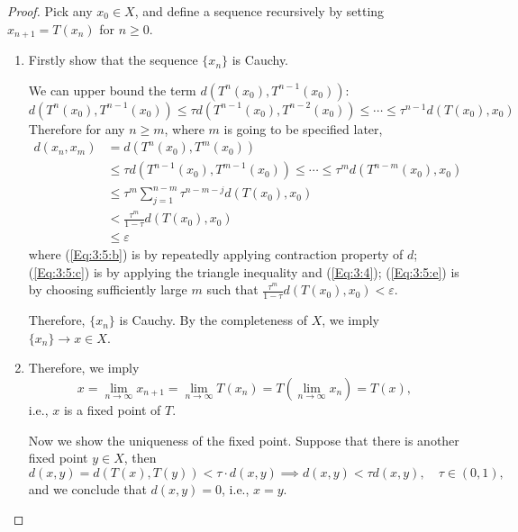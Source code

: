 \begin{proof}
Pick any $x_0\in X$, and define a sequence recursively by setting $x_{n+1}=T(x_n)$ for $n\ge0$.
\begin{enumerate}
\item
Firstly show that the sequence $\{x_n\}$ is Cauchy.

We can upper bound the term $d(T^n(x_0),T^{n-1}(x_0))$:
\begin{equation}\label{Eq:3:4}
d(T^n(x_0),T^{n-1}(x_0))\le \tau d(T^{n-1}(x_0),T^{n-2}(x_0))\le\cdots\le \tau^{n-1}d(T(x_0),x_0)
\end{equation}
Therefore for any $n\ge m$, where $m$ is going to be specified later,
\begin{subequations}
\begin{align}
d(x_n,x_m)&=d(T^n(x_0),T^m(x_0))\label{Eq:3:5:a}\\
&\le\tau d(T^{n-1}(x_0),T^{m-1}(x_0))\le\cdots\le\tau^md(T^{n-m}(x_0),x_0)\label{Eq:3:5:b}\\
&\le\tau^m\sum_{j=1}^{n-m}\tau^{n-m-j}d(T(x_0),x_0)\label{Eq:3:5:c}\\
&<\frac{\tau^{m}}{1-\tau}d(T(x_0),x_0)\label{Eq:3:5:d}\\
&\le\varepsilon\label{Eq:3:5:e}
\end{align}
\end{subequations}
where (\ref{Eq:3:5:b}) is by repeatedly applying contraction property of $d$; (\ref{Eq:3:5:c}) is by applying the triangle inequality and (\ref{Eq:3:4}); (\ref{Eq:3:5:e}) is by choosing sufficiently large $m$ such that $\frac{\tau^{m}}{1-\tau}d(T(x_0),x_0)<\varepsilon$.

Therefore, $\{x_n\}$ is Cauchy. By the completeness of $X$, we imply $\{x_n\}\to x\in X$.
\item
Therefore, we imply 
\[
x=\lim_{n\to\infty}x_{n+1}=\lim_{n\to\infty}T(x_n)=T(\lim_{n\to\infty}x_n)=T(x),
\]
i.e., $x$ is a fixed point of $T$.

Now we show the uniqueness of the fixed point. Suppose that there is another fixed point $y\in X$, then
\[
d(x,y)=d(T(x),T(y))<\tau\cdot d(x,y)\implies d(x,y)<\tau d(x,y),\quad\tau\in(0,1),
\]
and we conclude that $d(x,y)=0$, i.e., $x=y$.
\end{enumerate}
\end{proof}

